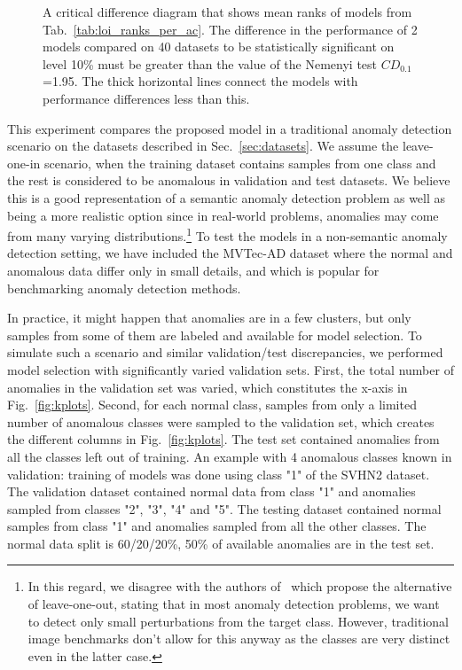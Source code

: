 

\begin{figure}[ht!] 
    \centering
    
    \caption{A critical difference diagram that shows mean ranks of models from Tab.~\ref{tab:loi_ranks_per_ac}. The difference in the performance of 2 models compared on 40 datasets to be statistically significant on level 10\% must be greater than the value of the Nemenyi test $CD_{0.1}$=1.95. The thick horizontal lines connect the models with performance differences less than this.}
    \label{fig:cd}
\end{figure}

This experiment compares the proposed model in a traditional anomaly detection scenario on the datasets described in Sec.~\ref{sec:datasets}. We assume the leave-one-in scenario, when the training dataset contains samples from one class and the rest is considered to be anomalous in validation and test datasets. We believe this is a good representation of a semantic anomaly detection problem as well as being a more realistic option since in real-world problems, anomalies may come from many varying distributions.\footnote{In this regard, we disagree with the authors of~\cite{ahmed2020detecting} which propose the alternative of leave-one-out, stating that in most anomaly detection problems, we want to detect only small perturbations from the target class. However, traditional image benchmarks don't allow for this anyway as the classes are very distinct even in the latter case.} To test the models in a non-semantic anomaly detection setting, we have included the MVTec-AD dataset where the normal and anomalous data differ only in small details, and which is popular for benchmarking anomaly detection methods.

In practice, it might happen that anomalies are in a few clusters, but only samples from some of them are labeled and available for model selection. To simulate such a scenario and similar validation/test discrepancies, we performed model selection with significantly varied validation sets. First, the total number of anomalies in the validation set was varied, which constitutes the x-axis in Fig.~\ref{fig:kplots}. Second, for each normal class, samples from only a limited number of anomalous classes were sampled to the validation set, which creates the different columns in Fig.~\ref{fig:kplots}. The test set contained anomalies from all the classes left out of training. An example with 4 anomalous classes known in validation: training of models was done using class "1" of the SVHN2 dataset. The validation dataset contained normal data from class "1" and anomalies sampled from classes "2", "3", "4" and "5". The testing dataset contained normal samples from class "1" and anomalies sampled from all the other classes. The normal data split is 60/20/20\%, 50\% of available anomalies are in the test set. 


